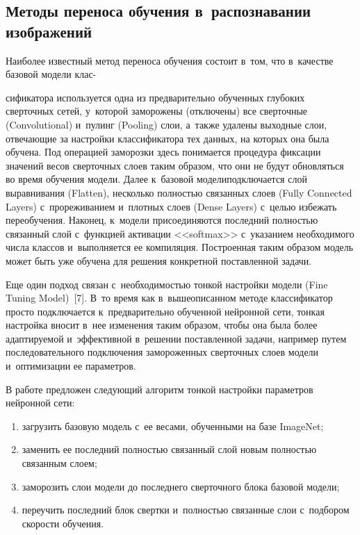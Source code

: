 \begin{multicols}{2}
\vspace*{-3pt}

\section{Методы переноса обучения в~распознавании 
изображений}

   Наиболее известный метод переноса обучения состоит в~том, что в~качестве 
базовой модели клас-\linebreak\vspace*{-12pt}

\pagebreak

\noindent
сификатора используется одна из предварительно 
обученных глубоких сверточных сетей, у~которой заморожены (отключены) все 
сверточные (Convolutional) и~пулинг (Pooling) слои, а~также удалены выходные 
слои, отвечающие за настройки классификатора тех данных, на которых она 
была обучена. Под операцией заморозки здесь понимается процедура фиксации 
значений весов сверточных слоев таким образом, что они не будут обновляться 
во время обучения модели. Далее к~базовой модели\linebreak подключается слой 
выравнивания (Flatten), не\-сколь\-ко полностью связанных слоев (Fully Connected 
Layers) с~прореживанием и~плотных слоев (Dense Layers) с~целью избежать 
переобучения. Наконец, к~модели присоединяются последний полностью 
связанный слой с~функцией активации <<softmax>> с~указанием необходимого 
числа классов и~выполняется ее компиляция. Построенная таким образом 
модель может быть уже обучена для решения конкретной поставленной задачи.
  
  Еще один подход связан с~необходимостью тонкой настройки модели (Fine 
Tuning Model)~[7]. В~то время как в~вышеописанном методе классификатор 
просто подключается к~предварительно обученной нейронной сети, тонкая 
настройка вносит в~нее изменения таким образом, чтобы она была более 
адап\-ти\-ру\-емой и~эффективной в~решении по\-став\-лен\-ной задачи, например путем 
последовательного подключения замороженных сверточных слоев модели 
и~оптимизации ее па\-ра\-мет\-ров. 
  
  В работе предложен сле\-ду\-ющий алгоритм тонкой настройки па\-ра\-мет\-ров 
нейронной сети: 
  \begin{enumerate}[(1)]
\item загрузить базовую модель с~ее весами, обученными на базе ImageNet;
\item заменить ее последний пол\-ностью связанный слой новым пол\-ностью 
связанным слоем;
\item заморозить слои модели до последнего сверточного блока базовой 
модели;
\item переучить последний блок свертки и~пол\-ностью связанные слои 
с~подбором ско\-рости обучения.
\end{enumerate}


\end{multicols}
